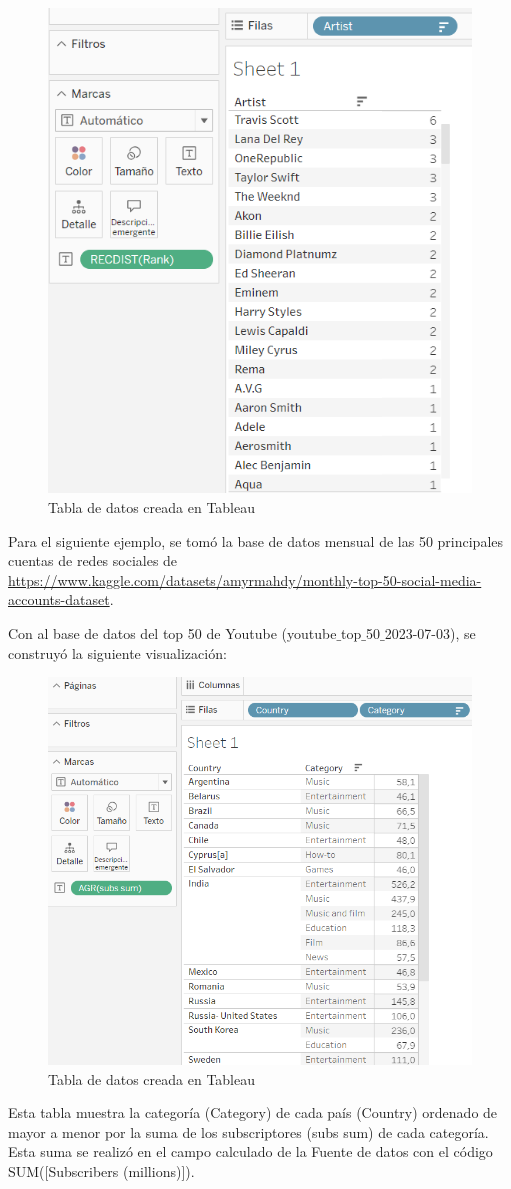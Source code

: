\documentclass[a4paper, 12pt]{book}
\begin{document}
\begin{figure}[H] 
	\centering 
	\includegraphics[width=0.7\linewidth]{tabla4.png}
	\caption{Tabla de datos creada en Tableau}
\end{figure}


Para el siguiente ejemplo, se tomó la base de datos mensual de las 50 principales cuentas de redes sociales de
\url{https://www.kaggle.com/datasets/amyrmahdy/monthly-top-50-social-media-accounts-dataset}.

Con al base de datos del top 50 de Youtube (youtube$\_$top$\_$50$\_$2023-07-03), se construyó la siguiente visualización:
\begin{figure}[H] 
	\centering 
	\includegraphics[width=0.7\linewidth]{tabla5.png}
	\caption{Tabla de datos creada en Tableau}
\end{figure}
Esta tabla muestra la categoría (Category) de cada país (Country) ordenado de mayor a menor por la suma de los subscriptores (subs sum) de cada categoría. Esta suma se realizó en el campo calculado de la Fuente de datos con el código SUM([Subscribers (millions)]).
\end{document}
